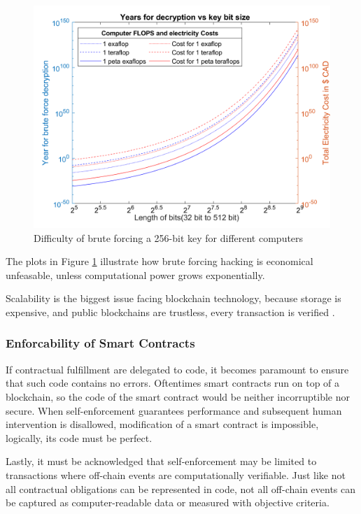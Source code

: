  	\begin{figure}[ht]
  	\centering 
  	\includegraphics[width=0.7\linewidth]{Diagrams/epicPic.png}
  	\caption{Difficulty of brute forcing a 256-bit key for different computers}
  	\label{security:fig2}
  	\end{figure}

The plots in Figure \ref{security:fig2} illustrate how brute forcing hacking is economical unfeasable, unless computational power grows exponentially.

Scalability is the biggest issue facing blockchain technology, because storage is expensive, and public blockchains are trustless, every transaction is verified \cite{EthScale:Online}. 

\subsubsection{Enforcability of Smart Contracts}



If contractual fulfillment are delegated to code, it becomes paramount to
ensure that such code contains no errors.  Oftentimes smart contracts run on top of a blockchain, so the code of the smart contract would be neither incorruptible nor secure. When self-enforcement guarantees performance and subsequent human intervention is disallowed, modification of a  smart contract is impossible, logically, its
code must be perfect. 

Lastly, it must be acknowledged that self-enforcement may be limited to transactions
where off-chain events are computationally verifiable. Just like not all contractual
obligations can be represented in code, not all off-chain events can be captured as
computer-readable data or measured with objective criteria. 


